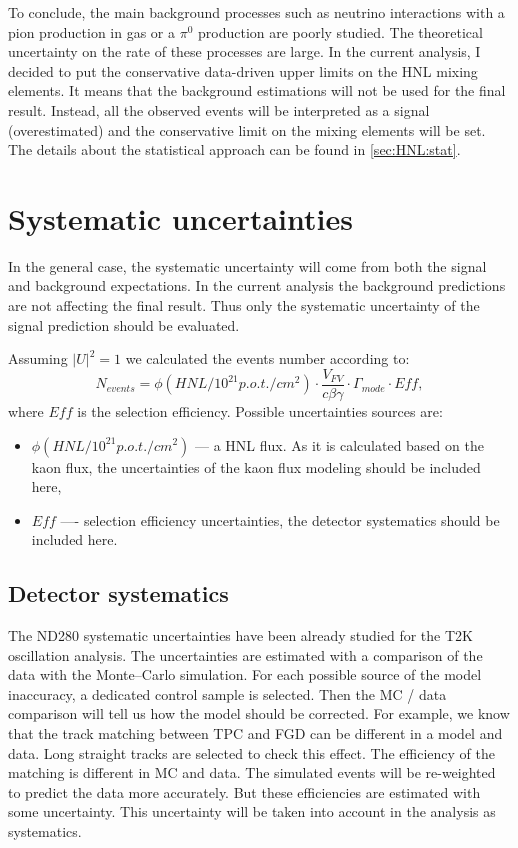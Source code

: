\documentclass[../main.tex]{subfiles}
\begin{document}
To conclude, the main background processes such as neutrino interactions with a pion production in gas or a $\pi^0$ production are poorly studied. The theoretical uncertainty on the rate of these processes are large. In the current analysis, I decided to put the conservative data-driven upper limits on the HNL mixing elements. It means that the background estimations will not be used for the final result. Instead, all the observed events will be interpreted as a signal (overestimated) and the conservative limit on the mixing elements will be set. The details about the statistical approach can be found in \autoref{sec:HNL:stat}.

\section{Systematic uncertainties}
\label{sec:HNL:sys}
In the general case, the systematic uncertainty will come from both the signal and background expectations. In the current analysis the background predictions are not affecting the final result. Thus only the systematic uncertainty of the signal prediction should be evaluated.

Assuming $\left|U\right|^2=1$ we calculated the events number according to:
\begin{equation}
  N_{events}=\phi(HNL/10^{21}p.o.t./cm^2)\cdot\frac{V_{FV}}{c\beta\gamma}\cdot\Gamma_{mode}\cdot Eff,
\end{equation}
where $Eff$ is the selection efficiency. Possible uncertainties sources are:
\begin{itemize}
  \item $\phi(HNL/10^{21}p.o.t./cm^2)$ --- a HNL flux. As it is calculated based on the kaon flux, the uncertainties of the kaon flux modeling should be included here,
  \item $Eff$ ---- selection efficiency uncertainties, the detector systematics should be included here.
\end{itemize}

\subsection{Detector systematics}
The ND280 systematic uncertainties have been already studied for the T2K oscillation analysis. The uncertainties are estimated with a comparison of the data with the Monte--Carlo simulation. For each possible source of the model inaccuracy, a dedicated control sample is selected. Then the MC / data comparison will tell us how the model should be corrected. For example, we know that the track matching between TPC and FGD can be different in a model and data. Long straight tracks are selected to check this effect. The efficiency of the matching is different in MC and data. The simulated events will be re-weighted to predict the data more accurately. But these efficiencies are estimated with some uncertainty. This uncertainty will be taken into account in the analysis as systematics.
\end{document}
